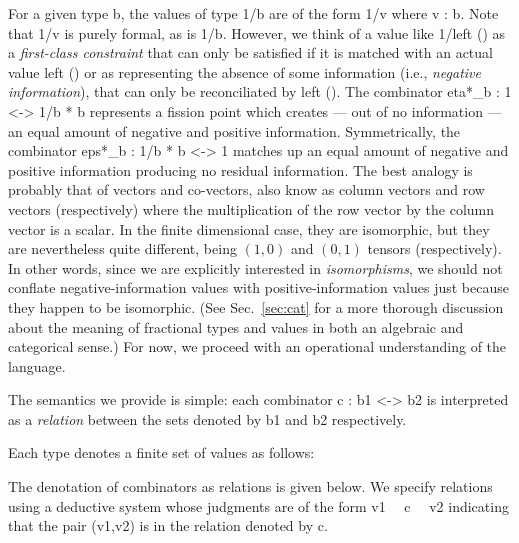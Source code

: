 \documentclass{llncs}
\begin{document}
For a given type {{b}}, the values of type {{1/b}} are of the form {{1/v}}
where {{v : b}}. Note that {{1/v}} is purely formal, as is {{1/b}}.  However,
we think of a value like {{1/left ()}} as a \emph{first-class constraint}
that can only be satisfied if it is matched with an actual value {{left ()}}
or as representing the absence of some information (i.e., \emph{negative
  information}), that can only be reconciliated by {{left ()}}. The
combinator {{eta*_b : 1 <-> 1/b * b}} represents a fission point which
creates --- out of no information --- an equal amount of negative and
positive information. Symmetrically, the combinator 
{{eps*_b : 1/b * b <-> 1}} 
matches up an equal amount of negative and positive information producing no
residual information.  The best analogy is probably that of vectors and
co-vectors, also know as column vectors and row vectors (respectively) where
the multiplication of the row vector by the column vector is a scalar. In the
finite dimensional case, they are isomorphic, but they are nevertheless quite
different, being $(1,0)$ and $(0,1)$ tensors (respectively).  In other words,
since we are explicitly interested in \emph{isomorphisms}, we should not
conflate negative-information values with positive-information values just
because they happen to be isomorphic. (See Sec.~\ref{sec:cat} for a more
thorough discussion about the meaning of fractional types and values in both an
algebraic and categorical sense.) For now, we proceed with an operational 
understanding of the language. 

The semantics we provide is simple: each combinator {{c : b1 <-> b2}} is
interpreted as a \emph{relation} between the sets denoted by {{b1}} and
{{b2}} respectively.

\begin{definition}
\label{chx:def:denot}
Each type denotes a finite set of values as follows:
\end{definition}

The denotation of combinators as relations is given below. We specify
relations using a deductive system whose judgments are of the form 
{{ v1 ~~c~~ v2 }} indicating that the pair {{(v1,v2)}} is in the relation 
denoted by {{c}}.
\end{document}
